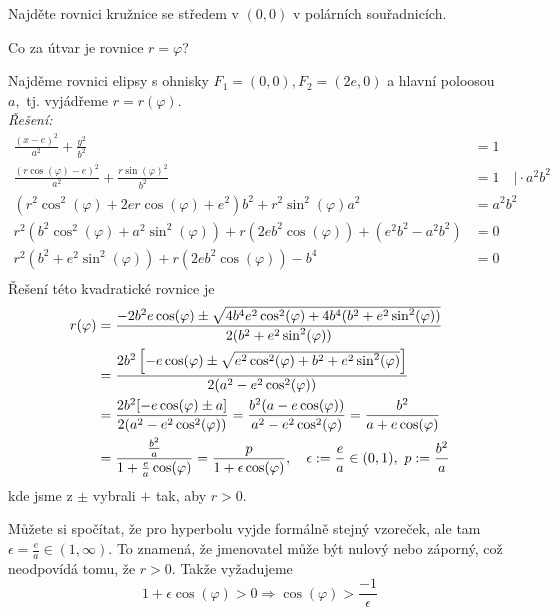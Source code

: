 \begin{úloha}Najděte rovnici kružnice se středem v $(0,0)$ v polárních souřadnicích. 
\end{úloha}

\begin{úloha}Co za útvar je rovnice $r=\varphi$? 
\end{úloha}

\begin{příklad}
  Najděme rovnici elipsy s ohnisky $F_1=(0,0), F_2=(2e,0)$ a hlavní poloosou $a,$ tj. vyjádřeme $r=r(\varphi).$\\
  \textit{Řešení:}
\begin{align*}
	\frac{(x-e)^{2}}{a^{2}}+\frac{y^{2}}{b^{2}}&=1 \\
	\frac{(r\cos(\varphi)-e)^{2}}{a^{2}}+\frac{r\sin(\varphi)^{2}}{b^{2}}&=1\quad \rvert \cdot a^{2}b^{2}\\
	(r^{2}\cos^{2}(\varphi)+2er\cos(\varphi)+e^{2})b^{2} + r^{2}\sin^{2}(\varphi)a^{2}&=a^{2}b^{2} \\
	r^{2}(b^{2}\cos^{2}(\varphi)+a^{2}\sin^{2}(\varphi))+r(2eb^{2}\cos(\varphi))+(e^{2}b^{2}-a^{2}b^{2})&=0 \\
	r^{2}(b^{2}+e^{2}\sin^{2}(\varphi))+r(2eb^{2}\cos(\varphi))-b^{4}&=0 \\
\end{align*}
Řešení této kvadratické rovnice je
\begin{align}
	r(\varphi) &= \frac{-2b^{2}e\cos(\varphi)\pm \sqrt{4b^{4}e^{2}\cos^{2}(\varphi)+4b^{4}(b^{2}+e^{2}\sin^{2}(\varphi))}}{2(b^{2}+e^{2}\sin^{2}(\varphi))}\notag \\
	&= \frac{2b^{2}\left[-e\cos(\varphi)\pm \sqrt{e^{2}\cos^{2}(\varphi)+b^{2}+e^{2}\sin^{2}(\varphi)}\right]}{2(a^{2}-e^{2}\cos^{2}(\varphi))}\notag \\
	&= \frac{2b^{2}[-e\cos(\varphi)\pm a]}{2(a^{2}-e^{2}\cos^{2}(\varphi))} = \frac{b^{2}(a-e\cos(\varphi))}{a^{2}-e^{2}\cos^{2}(\varphi)}=\frac{b^{2}}{a+e\cos(\varphi)}\notag \\
	&= \frac{\frac{b^{2}}{a}}{1+\frac{e}{a}\cos(\varphi)} = \frac{p}{1+\epsilon \cos(\varphi)},\quad \epsilon:=\frac{e}{a}\in(0,1),\ p:=\frac{b^{2}}{a}\label{eq:rovnice elipsy v polarnich} 
\end{align}
kde jsme z $\pm$ vybrali $+$ tak, aby $r>0.$
\end{příklad}
Můžete si spočítat, že pro hyperbolu vyjde formálně stejný vzoreček, ale tam $\epsilon=\frac{e}{a}\in(1,\infty).$ To znamená, že jmenovatel může být nulový nebo záporný, což neodpovídá tomu, že $r>0$. Takže vyžadujeme
\begin{equation*}
  1+\epsilon\cos(\varphi)>0 \Rightarrow \cos(\varphi)>\frac{-1}{\epsilon}
\end{equation*}

